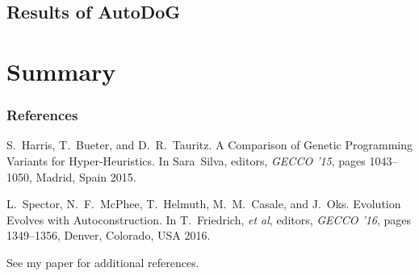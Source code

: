\documentclass{beamer}
\newcommand{\linespace}{\vskip 0.25cm}
\begin{document}
\subsection{Results of AutoDoG}

\section[Summary]{Summary}

\begin{frame} 
	\frametitle{References} 
	
	\begin{thebibliography}{lskdjf}
		
		S.~Harris, T.~Bueter, and D.~R.~Tauritz.
		\newblock A Comparison of Genetic Programming Variants for Hyper-Heuristics.
		\newblock In Sara~Silva, editors, {\em GECCO '15}, pages 1043--1050, Madrid, Spain 2015.
		
		L.~Spector, N.~F.~McPhee, T.~Helmuth, M.~M.~Casale, and J.~Oks.
		\newblock Evolution Evolves with Autoconstruction.
		\newblock In T.~Friedrich, \emph{et al}, editors, {\em GECCO '16}, pages 1349--1356, Denver, Colorado, USA 2016.
		
	\end{thebibliography}
	
	\linespace
	\begin{center}
		See my paper for additional references.
	\end{center}
\end{frame} 
\end{document}
